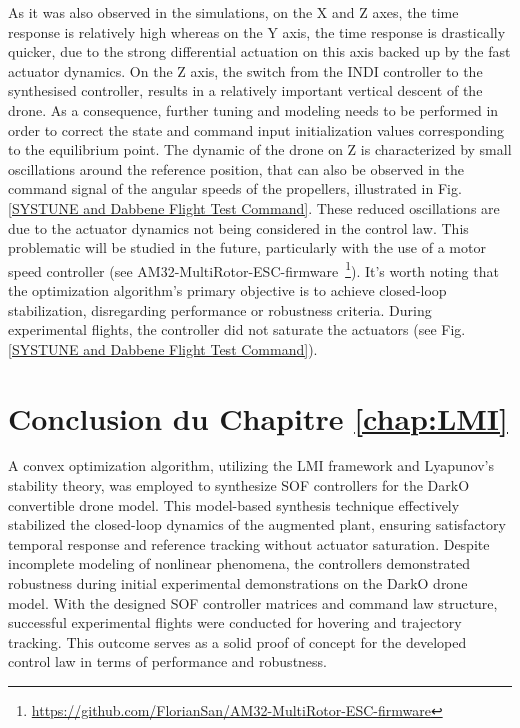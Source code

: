 As it was also observed in the simulations, on the X and Z axes, the time response is relatively high whereas on the Y axis, the time response is drastically quicker, due to the strong differential actuation on this axis backed up by the fast actuator dynamics. On the Z axis, the switch from the INDI controller to the synthesised controller, results in a relatively important vertical descent of the drone. As a consequence, further tuning and modeling needs to be performed in order to correct the state and command input initialization values corresponding to the equilibrium point. The dynamic of the drone on Z is characterized by small oscillations around the reference position, that can also be observed in the command signal of the angular speeds of the propellers, illustrated in  Fig. \ref{SYSTUNE and Dabbene Flight Test Command}. These reduced oscillations are due to the actuator dynamics not being considered in the control law. This problematic will be studied in the future, particularly with the use of a motor speed controller (see AM32-MultiRotor-ESC-firmware~\footnote{\url{https://github.com/FlorianSan/AM32-MultiRotor-ESC-firmware}}). It's worth noting that the optimization algorithm's primary objective is to achieve closed-loop stabilization, disregarding performance or robustness criteria. During experimental flights, the controller did not saturate the actuators (see Fig. \ref{SYSTUNE and Dabbene Flight Test Command}).


\section{Conclusion du Chapitre \ref{chap:LMI}}

A convex optimization algorithm, utilizing the LMI framework and Lyapunov’s stability theory, was employed to synthesize SOF controllers for the DarkO convertible drone model. This model-based synthesis technique effectively stabilized the closed-loop dynamics of the augmented plant, ensuring satisfactory temporal response and reference tracking without actuator saturation. Despite incomplete modeling of nonlinear phenomena, the controllers demonstrated robustness during initial experimental demonstrations on the DarkO drone model. With the designed SOF controller matrices and command law structure, successful experimental flights were conducted for hovering and trajectory tracking. This outcome serves as a solid proof of concept for the developed control law in terms of performance and robustness.